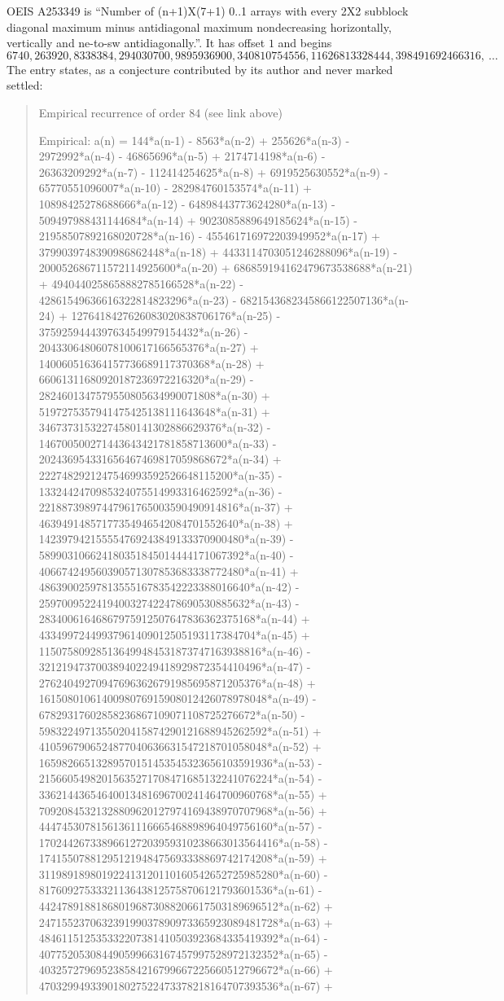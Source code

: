 \documentclass[11pt,a4paper]{article}
\theoremstyle{plain}
\theoremstyle{definition}
\begin{document}
OEIS A253349 is ``Number of (n+1)X(7+1) 0..1 arrays with every 2X2 subblock diagonal maximum minus antidiagonal maximum nondecreasing horizontally, vertically and ne-to-sw antidiagonally.''. It has offset $1$ and begins
\[
6740, 263920, 8338384, 294030700, 9895936900, 340810754556, 11626813328444, 398491692466316,\ \dots
\]
The entry states, as a conjecture contributed by its author and never marked settled:
\begin{quote}
Empirical recurrence of order 84 (see link above)

Empirical: a(n) = 144*a(n-1) - 8563*a(n-2) + 255626*a(n-3) - 2972992*a(n-4) - 46865696*a(n-5) + 2174714198*a(n-6) - 26363209292*a(n-7) - 112414254625*a(n-8) + 6919525630552*a(n-9) - 65770551096007*a(n-10) - 282984760153574*a(n-11) + 10898425278688666*a(n-12) - 64898443773624280*a(n-13) - 509497988431144684*a(n-14) + 9023085889649185624*a(n-15) - 21958507892168020728*a(n-16) - 455461716972203949952*a(n-17) + 3799039748390986862448*a(n-18) + 4433114703051246288096*a(n-19) - 200052686711572114925600*a(n-20) + 686859194162479673538688*a(n-21) + 4940440258658882785166528*a(n-22) - 42861549636616322814823296*a(n-23) - 6821543682345866122507136*a(n-24) + 1276418427626083020838706176*a(n-25) - 3759259444397634549979154432*a(n-26) - 20433064806078100617166565376*a(n-27) + 140060516364157736689117370368*a(n-28) + 66061311680920187236972216320*a(n-29) - 2824601347579550805634990071808*a(n-30) + 5197275357941475425138111643648*a(n-31) + 34673731532274580141302886629376*a(n-32) - 146700500271443643421781858713600*a(n-33) - 202436954331656467469817059868672*a(n-34) + 2227482921247546993592526648115200*a(n-35) - 1332442470985324075514993316462592*a(n-36) - 22188739897447961765003590490914816*a(n-37) + 46394914857177354946542084701552640*a(n-38) + 142397942155554769243849133370900480*a(n-39) - 589903106624180351845014444171067392*a(n-40) - 406674249560390571307853683338772480*a(n-41) + 4863900259781355516783542223388016640*a(n-42) - 2597009522419400327422478690530885632*a(n-43) - 28340061646867975912507647836362375168*a(n-44) + 43349972449937961409012505193117384704*a(n-45) + 115075809285136499484531873747163938816*a(n-46) - 321219473700389402249418929872354410496*a(n-47) - 276240492709476963626791985695871205376*a(n-48) + 1615080106140098076915908012426078978048*a(n-49) - 67829317602858236867109071108725276672*a(n-50) - 5983224971355020415874290121688945262592*a(n-51) + 4105967906524877040636631547218701058048*a(n-52) + 16598266513289570151453545323656103591936*a(n-53) - 21566054982015635271708471685132241076224*a(n-54) - 33621443654640013481696700241464700960768*a(n-55) + 70920845321328809620127974169438970707968*a(n-56) + 44474530781561361116665468898964049756160*a(n-57) - 170244267338966127203959310238663013564416*a(n-58) - 17415507881295121948475693338869742174208*a(n-59) + 311989189801922413120110160542652725985280*a(n-60) - 81760927533321136438125758706121793601536*a(n-61) - 442478918818680196873088206617503189696512*a(n-62) + 247155237063239199037890973365923089481728*a(n-63) + 484611512535332207381410503923684335419392*a(n-64) - 407752053084490599663167457997528972132352*a(n-65) - 403257279695238584216799667225660512796672*a(n-66) + 470329949339018027522473378218164707393536*a(n-67) + 
\end{quote}
\end{document}
